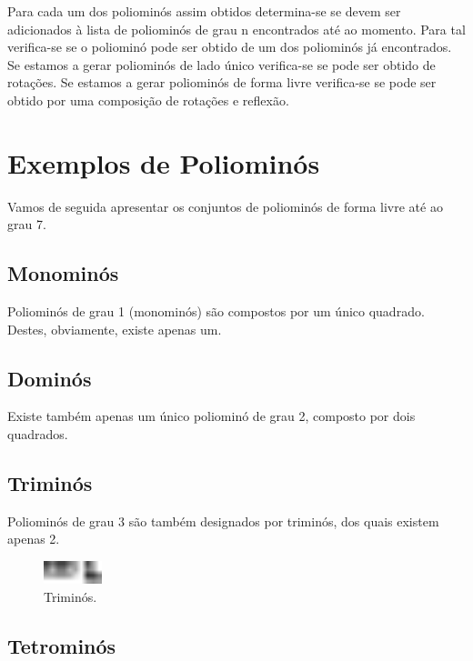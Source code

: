 \documentclass[11pt]{article}
\begin{document}
Para cada um dos poliominós assim obtidos determina-se se devem ser
adicionados à lista de poliominós de grau n encontrados até ao
momento. Para tal verifica-se se o poliominó pode ser obtido de um dos
poliominós já encontrados. Se estamos a gerar poliominós de lado único
verifica-se se pode ser obtido de rotações. Se estamos a gerar
poliominós de forma livre verifica-se se pode ser obtido por uma
composição de rotações e reflexão.





\section{Exemplos de Poliominós}

Vamos de seguida apresentar os conjuntos de poliominós de forma livre
até ao grau 7.


\subsection{Monominós}

Poliominós de grau 1 (monominós) são compostos por um único
quadrado. Destes, obviamente, existe apenas um.


\subsection{Dominós}

Existe também apenas um único poliominó de grau 2, composto por dois
quadrados.


\subsection{Triminós}

Poliominós de grau 3 são também designados por triminós, dos quais
existem apenas 2.

\begin{figure}[H]
\centering
  \includegraphics[width=0.15\textwidth]{../images/poliominos-3-free.pdf}
\caption{Triminós.}
\end{figure}


\subsection{Tetrominós}
\end{document}
